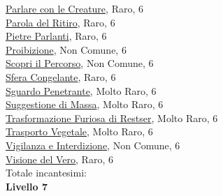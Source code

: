 \begin{multicols}{3}
{{\hyperlink{Parlare con le Creature}{Parlare con le Creature}, Raro, 6\\
\hyperlink{Parola del Ritiro}{Parola del Ritiro}, Raro, 6\\
\hyperlink{Pietre Parlanti}{Pietre Parlanti}, Raro, 6\\
\hyperlink{Proibizione}{Proibizione}, Non Comune, 6\\
\hyperlink{Scopri il Percorso}{Scopri il Percorso}, Non Comune, 6\\
\hyperlink{Sfera Congelante}{Sfera Congelante}, Raro, 6\\
\hyperlink{Sguardo Penetrante}{Sguardo Penetrante}, Molto Raro, 6\\
\hyperlink{Suggestione di Massa}{Suggestione di Massa}, Molto Raro, 6\\
\hyperlink{Trasformazione Furiosa di Restser}{Trasformazione Furiosa di Restser}, Molto Raro, 6\\
\hyperlink{Trasporto Vegetale}{Trasporto Vegetale}, Molto Raro, 6\\
\hyperlink{Vigilanza e Interdizione}{Vigilanza e Interdizione}, Non Comune, 6\\
\hyperlink{Visione del Vero}{Visione del Vero}, Raro, 6\\

\medskip Totale incantesimi: \theinclvsei\\

\textbf{Livello 7}

}}
\end{multicols}
